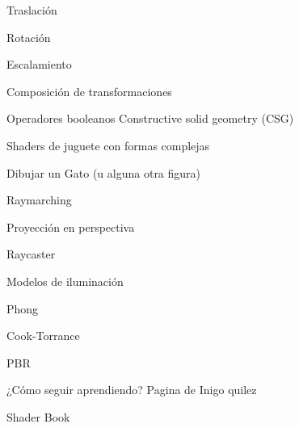 \begin{frame}{Traslación}

\end{frame}

\begin{frame}{Rotación}

\end{frame}

\begin{frame}{Escalamiento}

\end{frame}

\begin{frame}{Composición de transformaciones}

\end{frame}

\begin{frame}{Operadores booleanos}
Constructive solid geometry (CSG)
\end{frame}

\begin{frame}{}
Shaders de juguete con formas complejas

Dibujar un Gato (u alguna otra figura)
\end{frame}

\begin{frame}{Raymarching}

\end{frame}

\begin{frame}{Proyección en perspectiva}

\end{frame}

\begin{frame}{Raycaster}

\end{frame}

\begin{frame}{Modelos de iluminación}

\end{frame}

\begin{frame}{Phong}

\end{frame}

\begin{frame}{Cook-Torrance}

\end{frame}

\begin{frame}{PBR}

\end{frame}

\begin{frame}{¿Cómo seguir aprendiendo?}
Pagina de Inigo quilez

Shader Book

\end{frame}
